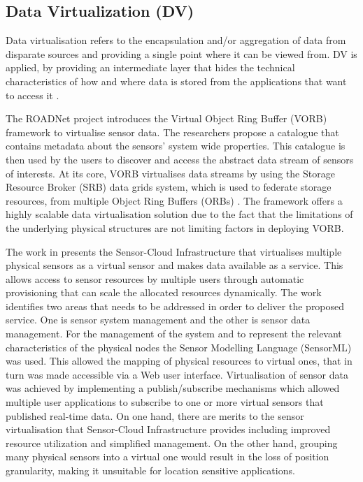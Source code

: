 \subsection{Data Virtualization (DV)}
Data virtualisation refers to the encapsulation and/or aggregation of data from disparate sources and providing a single point where it can be viewed from. DV is applied, by providing an intermediate layer 
that hides the technical characteristics of how and where data is stored from the applications that want to access it \cite{book:1035720}. 

The ROADNet \cite{Rajasekar:2005:ASD:1080885.1080892} project introduces the Virtual Object Ring Buffer (VORB) framework  to virtualise sensor data. The researchers propose a catalogue that contains metadata about the sensors' system wide properties. This catalogue is then used by the users to discover and access the abstract data stream of sensors of interests. At its core, VORB virtualises data streams by using the Storage Resource Broker (SRB) \cite{baru1998sdsc} data grids system, which is used to federate storage resources, from multiple Object Ring Buffers (ORBs) \cite{moore2004data}. The framework offers a highly scalable data virtualisation solution due to the fact that the limitations of the underlying physical structures are not limiting factors in deploying VORB. 

The work in \cite{yuriyama2010sensor} presents the Sensor-Cloud Infrastructure that virtualises multiple physical sensors as a virtual sensor and makes data available as a service. This allows access to sensor resources by multiple users through automatic provisioning that can scale the allocated resources dynamically. The work identifies two areas that needs to be addressed in order to deliver the proposed service. One is sensor system management and the other is sensor data management. For the management of the system and to represent the relevant characteristics of the physical nodes the Sensor Modelling Language (SensorML) \cite{botts2007opengis} was used. This allowed the mapping of physical resources to virtual ones, that in turn was made accessible via a Web user interface. Virtualisation of sensor data was achieved by implementing a publish/subscribe \cite{book:1001628} mechanisms which allowed multiple user applications to subscribe to one or more virtual sensors that published real-time data. On one hand, there are merits to the sensor virtualisation that Sensor-Cloud Infrastructure provides including improved resource utilization and simplified management. On the other hand, grouping many physical sensors into a virtual one would result in the loss of position granularity, making it unsuitable for location sensitive applications. 





